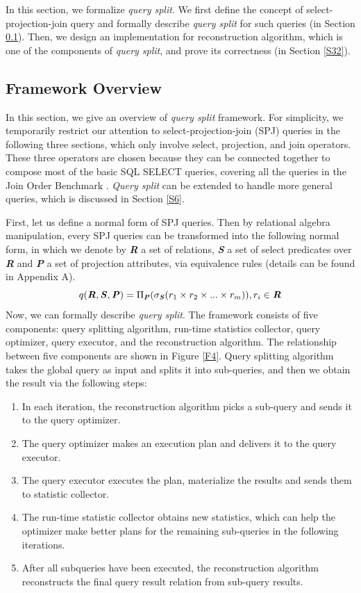 In this section, we formalize \textit{query split}. We first define the concept of select-projection-join query and formally describe \textit{query split} for such queries (in Section \ref{S31}). Then, we design an implementation for reconstruction algorithm, which is one of the components of \textit{query split}, and prove its correctness (in Section \ref{S32}).
\subsection{Framework Overview} \label{S31}
    In this section, we give an overview of \textit{query split} framework. For simplicity, we temporarily restrict our attention to select-projection-join (SPJ) queries in the following three sections, which only involve select, projection, and join operators. These three operators are chosen because they can be connected together to compose most of the basic SQL SELECT queries, covering all the queries in the Join Order Benchmark \cite{JOB}. \textit{Query split} can be extended to handle more general queries, which is discussed in Section \ref{S6}.\par
    First, let us define a normal form of SPJ queries. Then by relational algebra manipulation, every SPJ queries can be transformed into the following normal form, in which we denote by \textbf{\textit{R}} a set of relations, \textbf{\textit{S}} a set of select predicates over \textbf{\textit{R}} and \textbf{\textit{P}} a set of projection attributes, via equivalence rules (details can be found in Appendix A).
    $$q(\textbf{\textit{R}},\textbf{\textit{S}},\textbf{\textit{P}})=\Pi_{\textbf{{\textit{P}}}}(\sigma_{\textbf{\textit{S}}}(r_1 \times r_2 \times... \times r_m)),r_i \in \textbf{\textit{R}}$$
    Now, we can formally describe \textit{query split}. The framework consists of five components: query splitting algorithm, run-time statistics collector, query optimizer, query executor, and the reconstruction algorithm. The relationship between five components are shown in Figure \ref{F4}. Query splitting algorithm takes the global query as input and splits it into sub-queries, and then we obtain the result via the following steps:
    \begin{enumerate}[leftmargin = 15pt]
        \item In each iteration, the reconstruction algorithm picks a sub-query and sends it to the query optimizer.
        \item The query optimizer makes an execution plan and delivers it to the query executor.
        \item The query executor executes the plan, materialize the results and sends them to statistic collector.
        \item The run-time statistic collector obtains new statistics, which can help the optimizer make better plans for the remaining sub-queries in the following iterations.
        \item After all subqueries have been executed, the reconstruction algorithm reconstructs the final query result relation from sub-query results.
    \end{enumerate}
